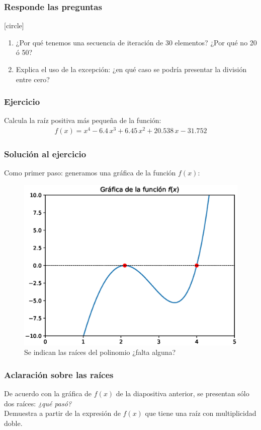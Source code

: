 \begin{frame}
\frametitle{Responde las preguntas}
[circle]
\begin{enumerate}[<+->]
\item ¿Por qué tenemos una secuencia de iteración de 30 elementos? ¿Por qué no 20 ó 50?
\item Explica el uso de la excepción: ¿en qué caso se podría presentar la división entre cero?
\end{enumerate}
\end{frame}
\begin{frame}
\frametitle{Ejercicio}
Calcula la raíz positiva más pequeña de la función:
\begin{align*}
f(x) = x^{4} - 6.4 \, x^{3} + 6.45 \, x^{2} + 20.538 \, x - 31.752
\end{align*}
\end{frame}
\begin{frame}
\frametitle{Solución al ejercicio}
Como primer paso: generamos una gráfica de la función $f(x)$:
\begin{figure}
   \centering
   \includegraphics[scale=0.4]{Imagenes/raices_NR_2020_01.eps}
   \caption{Se indican las raíces del polinomio ¿falta alguna?}
\end{figure}
\end{frame}
\begin{frame}
\frametitle{Aclaración sobre las raíces}
De acuerdo con la gráfica de $f(x)$ de la diapositiva anterior, se presentan sólo dos raíces: \emph{¿qué pasó?}
\\
\bigskip
Demuestra a partir de la expresión de $f(x)$ que tiene una raíz con multiplicidad doble.
\end{frame}
